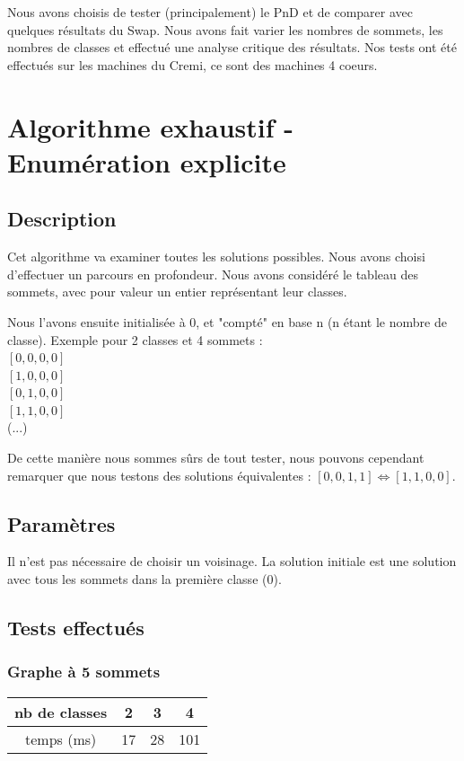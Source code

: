 \documentclass[12pt]{article}
\begin{document}
Nous avons choisis de tester (principalement) le PnD et de comparer avec quelques résultats du Swap. Nous avons fait varier les nombres de sommets, les nombres de classes et effectué une analyse critique des résultats. Nos tests ont été effectués sur les machines du Cremi, ce sont des machines 4 coeurs.

\newpage

\section{Algorithme exhaustif - Enumération explicite}
\subsection{Description}
Cet algorithme va examiner toutes les solutions possibles. Nous avons choisi d'effectuer un parcours en profondeur.
Nous avons considéré le tableau des sommets, avec pour valeur un entier représentant leur classes.
~\par Nous l'avons ensuite initialisée à 0, et "compté" en base n (n étant le nombre de classe). Exemple pour 2 classes et 4 sommets :
~\\ $[0, 0, 0, 0]$
~\\ $[1, 0, 0, 0]$
~\\ $[0, 1, 0, 0]$
~\\ $[1, 1, 0, 0]$
~\\ (...)
~\par De cette manière nous sommes sûrs de tout tester, nous pouvons cependant remarquer que nous testons des solutions équivalentes : $[0, 0, 1, 1] \Leftrightarrow [1, 1, 0, 0]$.

\subsection{Paramètres}
Il n’est pas nécessaire de choisir un voisinage. La solution initiale est une solution avec tous les sommets dans la première classe (0).

\subsection{Tests effectués}

\subsubsection{Graphe à 5 sommets}

\begin{tabular}{|c|c|c|c|}
	\hline 
	nb de classes & 2 & 3 & 4 \\
	\hline
	temps (ms) & 17 & 28 & 101 \\
	\hline
\end{tabular}
\end{document}
